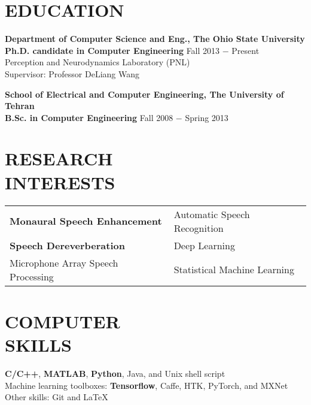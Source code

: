 \documentclass[margin, 10pt]{res}
\begin{document}
\begin{resume}

\section{EDUCATION}
\textbf{Department of Computer Science and Eng., The Ohio State University }  \\
\textbf{Ph.D. candidate in Computer Engineering} \hfill {\footnotesize Fall 2013 $-$ Present} \\
Perception and Neurodynamics Laboratory (PNL)\\
Supervisor: Professor DeLiang Wang

\textbf{School of Electrical and Computer Engineering, The University of Tehran}\\
\textbf{B.Sc. in Computer Engineering} \hfill {\footnotesize Fall 2008 $-$ Spring 2013} 

\section{RESEARCH\\INTERESTS}
\begin{tabular}{l l}
\textbf{Monaural Speech Enhancement}    & \hspace{0.3in}   Automatic Speech Recognition\\ 
\textbf{Speech Dereverberation}    & \hspace{0.3in}    Deep Learning\\ 
Microphone Array Speech Processing  & \hspace{0.3in} Statistical Machine Learning
\end{tabular}

\section{COMPUTER \\ SKILLS}
\textbf{C/C++}, \textbf{MATLAB}, \textbf{Python}, Java, and Unix shell script\\
Machine learning toolboxes: \textbf{Tensorflow},
Caffe, HTK, PyTorch, and MXNet\\
Other skills: Git and LaTeX


\end{resume}
\end{document}
